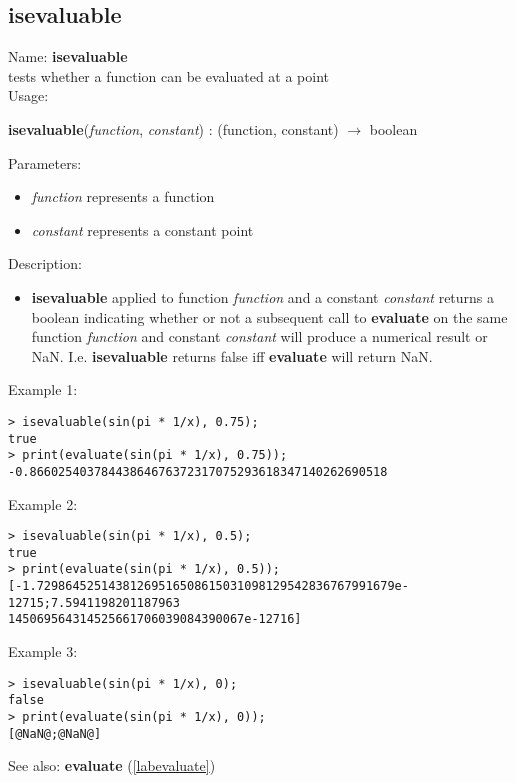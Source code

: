 \subsection{isevaluable}
\label{labisevaluable}
\noindent Name: \textbf{isevaluable}\\
tests whether a function can be evaluated at a point \\

\noindent Usage: 
\begin{center}
\textbf{isevaluable}(\emph{function}, \emph{constant}) : (\textsf{function}, \textsf{constant}) $\rightarrow$ \textsf{boolean}\\
\end{center}
Parameters: 
\begin{itemize}
\item \emph{function} represents a function
\item \emph{constant} represents a constant point
\end{itemize}
\noindent Description: \begin{itemize}

\item \textbf{isevaluable} applied to function \emph{function} and a constant \emph{constant} returns
   a boolean indicating whether or not a subsequent call to \textbf{evaluate} on the
   same function \emph{function} and constant \emph{constant} will produce a numerical
   result or NaN. I.e. \textbf{isevaluable} returns false iff \textbf{evaluate} will return NaN.
\end{itemize}
\noindent Example 1: 
\begin{center}\begin{minipage}{15cm}\begin{Verbatim}[frame=single]
> isevaluable(sin(pi * 1/x), 0.75);
true
> print(evaluate(sin(pi * 1/x), 0.75));
-0.86602540378443864676372317075293618347140262690518
\end{Verbatim}
\end{minipage}\end{center}
\noindent Example 2: 
\begin{center}\begin{minipage}{15cm}\begin{Verbatim}[frame=single]
> isevaluable(sin(pi * 1/x), 0.5);
true
> print(evaluate(sin(pi * 1/x), 0.5));
[-1.72986452514381269516508615031098129542836767991679e-12715;7.5941198201187963
145069564314525661706039084390067e-12716]
\end{Verbatim}
\end{minipage}\end{center}
\noindent Example 3: 
\begin{center}\begin{minipage}{15cm}\begin{Verbatim}[frame=single]
> isevaluable(sin(pi * 1/x), 0);
false
> print(evaluate(sin(pi * 1/x), 0));
[@NaN@;@NaN@]
\end{Verbatim}
\end{minipage}\end{center}
See also: \textbf{evaluate} (\ref{labevaluate})
